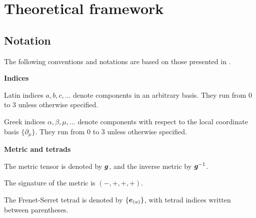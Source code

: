 \documentclass[12pt]{article}
\begin{document}
\section{Theoretical framework}

\subsection{Notation}

The following conventions and notations are based on those presented in \cite{gourgoulhon2013special, chandrasekhar1998mathematical}.

\begin{center}  \bf Indices \end{center}
Latin indices $a,b,c,\dots$ denote components in an arbitrary basis. They run from $0$ to $3$ unless otherwise specified.

\noindent Greek indices $\alpha,\beta,\mu,\dots$ denote components with respect to the local coordinate basis $\{\partial_\mu\}$. They run from $0$ to $3$ unless otherwise specified.

\begin{center} \bf Metric and tetrads \end{center}
The metric tensor is denoted by $\boldsymbol{g}$, and the inverse metric by $\boldsymbol{g}^{-1}$.

\noindent The signature of the metric is $(-,+,+,+)$.

\noindent The Frenet-Serret tetrad is denoted by $\{\boldsymbol{e}_{(a)}\}$, with tetrad indices written between parentheses.
\end{document}
